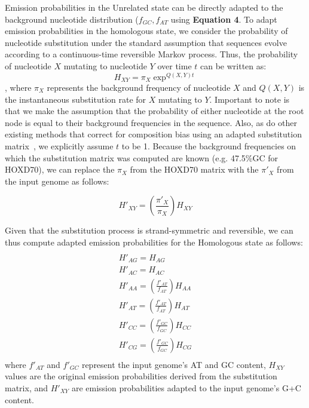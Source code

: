 Emission
probabilities in the Unrelated state can be directly adapted to the
background nucleotide distribution ($f_{GC}, f_{AT}$ using \textbf {Equation 4}. To adapt emission probabilities in the homologous state, we consider the
probability of nucleotide substitution under the standard assumption
that sequences evolve according to a continuous-time reversible Markov process.
Thus, the probability of nucleotide $X$ mutating to nucleotide $Y$ over time $t$
can be written as: 
\begin{equation}
H_{XY}=\pi_X \exp^{Q(X,Y)t}
\end{equation}
, where $\pi_X$ represents the background
frequency of nucleotide $X$ and $Q(X,Y)$ is the instantaneous substitution rate for $X$
mutating to $Y$. Important to note is that we make the assumption that the probability of
either nucleotide at the root node is equal to their background
frequencies in the sequence. Also, as do other existing methods that correct for composition bias using an adapted substitution matrix~\cite{repseek}, we explicitly assume $t$ to be 1.  Because the background frequencies on which the substitution matrix was computed are
known (e.g. 47.5\%GC for HOXD70), we can replace the $\pi_X$ from the HOXD70 matrix
with the $\pi'_X$ from the input genome as follows:

\begin{equation}
H'_{XY}=(\frac{\pi'_X}{\pi_X})  H_{XY}
\end{equation}

Given that the substitution process is
strand-symmetric and reversible, we can thus compute adapted
emission probabilities for the Homologous state as follows:
\begin{multline}\\
H'_{AG}=H_{AG}\\
H'_{AC}=H_{AC}\\
H'_{AA}=(\frac{f'_{AT}}{f_{AT}})H_{AA}\\
H'_{AT}=(\frac{f'_{AT}}{f_{AT}})H_{AT}\\
H'_{CC}=(\frac{f'_{GC}}{f_{GC}})H_{CC}\\
H'_{CG}=(\frac{f'_{GC}}{f_{GC}})H_{CG}\\
\end{multline}
where $f'_{AT}$ and $f'_{GC}$ represent the input genome's AT and GC content,
$H_{XY}$ values are the original emission probabilities derived from the
substitution matrix, and $H'_{XY}$ are emission probabilities adapted to
the input genome's G+C content.


